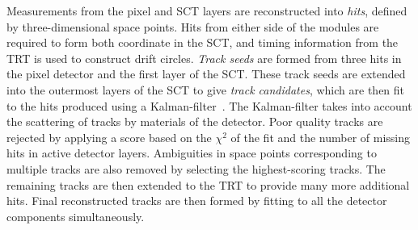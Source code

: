 Measurements from the pixel and SCT layers are reconstructed into \emph{hits}, defined by three-dimensional space points. Hits from either side of the modules are required to form both coordinate in the SCT, and timing information from the TRT is used to construct drift circles. \emph{Track seeds} are formed from three hits in the pixel detector and the first layer of the SCT. These track seeds are extended into the outermost layers of the SCT to give \emph{track candidates}, which are then fit to the hits produced using a Kalman-filter~\cite{ATLAS:tracking,ATLAS:Kalman}. The Kalman-filter takes into account the scattering of tracks by materials of the detector. Poor quality tracks are rejected by applying a score based on the $\chi^2$ of the fit and the number of missing hits in active detector layers. Ambiguities in space points corresponding to multiple tracks are also removed by selecting the highest-scoring tracks. The remaining tracks are then extended to the TRT to provide many more additional hits. Final reconstructed tracks are then formed by fitting to all the detector components simultaneously. 


